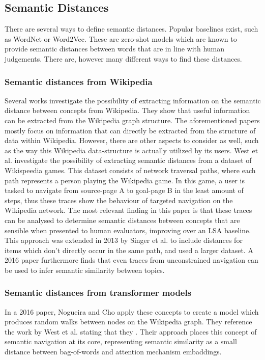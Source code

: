 \subsection{Semantic Distances}
There are several ways to define semantic distances. Popular baselines exist, such as WordNet or Word2Vec. These are zero-shot models which are known to provide semantic distances between words that are in line with human judgements. There are, however many different ways to find these distances. 

\subsubsection{Semantic distances from Wikipedia}
Several works investigate the possibility of extracting information on the semantic distance between concepts from Wikipedia\cite{efficientwordnetwikipedia, extendingwordnet, wikipediaconceptmaps}. They show that useful information can be extracted from the Wikipedia graph structure. The aforementioned papers mostly focus on information that can directly be extracted from the structure of data within Wikipedia. However, there are other aspects to consider as well, such as the way this Wikipedia data-structure is actually utilized by its users. West et al. \cite{semdistances} investigate the possibility of extracting semantic distances from a dataset of Wikispeedia games. This dataset consists of network traversal paths, where each path represents a person playing the Wikipedia game. In this game, a user is tasked to navigate from source-page A to goal-page B in the least amount of steps, thus these traces show the behaviour of targeted navigation on the Wikipedia network. The most relevant finding in this paper is that these traces can be analysed to determine semantic distances between concepts that are sensible when presented to human evaluators, improving over an LSA baseline. This approach was extended in 2013 by Singer et al.\cite{semdistancesbetter} to include distances for items which don't directly occur in the same path, and used a larger dataset. A 2016 paper \cite{semanticsunconstrainedwikipedia} furthermore finds that even traces from unconstrained navigation can be used to infer semantic similarity between topics.

\subsubsection{Semantic distances from transformer models}
In a 2016 paper, Nogueira and Cho apply these concepts to create a model which produces random walks between nodes on the Wikipedia graph\cite{LSTMembedding}. They reference the work by West et al. stating that they \cite{semdistances}. Their approach places this concept of semantic navigation at its core, representing semantic similarity as a small distance between bag-of-words and attention mechanism embaddings.

